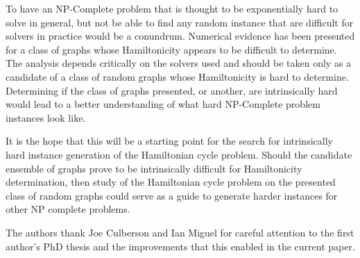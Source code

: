 \documentclass[twoside,11pt]{article}
\begin{document}
To have an NP-Complete problem that is thought to be exponentially hard to solve in general, but not be able to
find any random instance that are difficult for solvers in practice would be a conundrum.  Numerical evidence has
been presented
for a class of graphs
whose Hamiltonicity appears to be difficult to determine.
The analysis depends critically
on the solvers used and should be taken only as a candidate of a class of random graphs whose Hamiltonicity is hard to
determine.  Determining if the class of graphs
presented, or another, are intrinsically hard would lead to a better understanding of what hard NP-Complete problem
instances look like.

It is the hope that this will be a starting point for the search for intrinsically hard instance generation
of the Hamiltonian cycle problem. 
Should the candidate ensemble of graphs prove to be intrinsically difficult for Hamiltonicity determination,
then study of the Hamiltonian cycle problem on the presented class of random graphs
could serve as a guide to generate harder instances for other NP complete problems.

\acks
The authors thank Joe Culberson and Ian Miguel for careful attention to the first author's PhD thesis and the improvements that this enabled in the current paper. 




\end{document}
